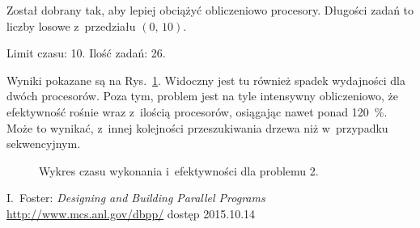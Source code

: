 \documentclass[a4paper; 12pt]{article}
\begin{document}
Został dobrany tak, aby lepiej obciążyć obliczeniowo procesory.
Długości zadań to liczby losowe z~przedziału $(0,\,10)$.

Limit czasu: 10.
Ilość zadań: 26.

Wyniki pokazane są na Rys.~\ref{fig:problem2}.
Widoczny jest tu również spadek wydajności dla dwóch procesorów.
Poza tym, problem jest na tyle intensywny obliczeniowo, że efektywność rośnie
wraz z~ilością procesorów, osiągając nawet ponad \SI{120}{\percent}.
Może to wynikać, z~innej kolejności przeszukiwania drzewa niż w~przypadku
sekwencyjnym.

\begin{figure}[h]
    \centering
    \caption{Wykres czasu wykonania i~efektywności dla problemu 2.}
    \label{fig:problem2}
\end{figure}



\begin{thebibliography}{9}
        I.~Foster: \emph{Designing and Building Parallel Programs}
        \url{http://www.mcs.anl.gov/dbpp/} dostęp 2015.10.14
\end{thebibliography}
\end{document}
